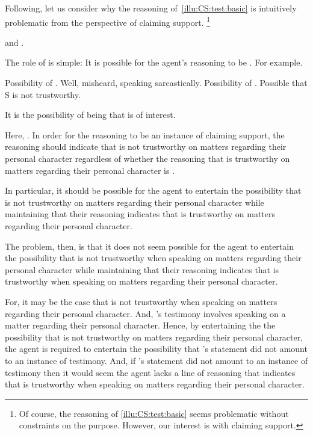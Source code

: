 \begin{note}
  Following, let us consider why the reasoning of~\autoref{illu:CS:test:basic} is intuitively problematic from the perspective of claiming support.\nolinebreak
  \footnote{
    Of course, the reasoning of \autoref{illu:CS:test:basic} seems problematic without constraints on the purpose.
    However, our interest is with claiming support.
  }

  \ideaCSA{} and \ideaCSB{}.

  The role of \ideaCSA{} is simple: It is possible for the agent's reasoning to be \mom{}.
  For example.

  Possibility of \mistaken{}.
  Well, misheard, speaking sarcastically.
  Possibility of \misled{}.
  Possible that S is not trustworthy.

  It is the possibility of being \misled{} that is of interest.

  Here, \ideaCSB{}.
  In order for the reasoning to be an instance of claiming support, the reasoning should indicate that  is not trustworthy on matters regarding their personal character regardless of whether the reasoning that  is trustworthy on matters regarding their personal character is \mom{}.

  In particular, it should be possible for the agent to entertain the possibility that  is not trustworthy on matters regarding their personal character while maintaining that their reasoning indicates that  is trustworthy on matters regarding their personal character.
\end{note}

\begin{note}
  The problem, then, is that it does not seem possible for the agent to entertain the possibility that  is not trustworthy when speaking on matters regarding their personal character while maintaining that their reasoning indicates that  is trustworthy when speaking on matters regarding their personal character.

  For, it may be the case that  is not trustworthy when speaking on matters regarding their personal character.
  And, 's testimony involves speaking on a matter regarding their personal character.
  Hence, by entertaining the the possibility that  is not trustworthy on matters regarding their personal character, the agent is required to entertain the possibility that 's statement did not amount to an instance of testimony.
  And, if 's statement did not amount to an instance of testimony then it would seem the agent lacks a line of reasoning that indicates that  is trustworthy when speaking on matters regarding their personal character.
\end{note}

